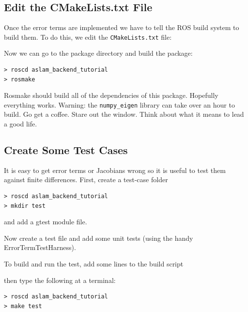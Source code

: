 \documentclass[11pt,a4,oneside]{article}
\newcommand{\txt}[1]{{\footnotesize\texttt{#1}}}
\newcommand{\listcpp}[2]{}
\newcommand{\listcpprange}[4]{}
\begin{document}
\subsection{Edit the CMakeLists.txt File}
Once the error terms are implemented we have to tell the ROS build system to build them. To do this, we edit the \txt{CMakeLists.txt} file:
\listcpprange{CMakeLists.txt}{../../aslam_backend_tutorial/CMakeLists.txt}{32}{38}
Now we can go to the package directory and build the package:
\begin{lstlisting}
> roscd aslam_backend_tutorial
> rosmake
\end{lstlisting}
Rosmake should build all of the dependencies of this package. Hopefully everything works. Warning: the \txt{numpy\_eigen} library can take over an hour to build. Go get a coffee. Stare out the window. Think about what it means to lead a good life.
\subsection{Create Some Test Cases}
It is easy to get error terms or Jacobians wrong so it is useful to test them against finite differences. First, create a test-case folder
\begin{lstlisting}
> roscd aslam_backend_tutorial
> mkdir test
\end{lstlisting}
and add a gtest module file.
\listcpp{test/test\_main.cpp}{../../aslam_backend_tutorial/test/test_main.cpp}
Now create a test file and add some unit tests (using the handy ErrorTermTestHarness).
\listcpp{test/ErrorTests.cpp}{../../aslam_backend_tutorial/test/ErrorTests.cpp}
To build and run the test, add some lines to the build script
\listcpprange{CMakeLists.txt}{../../aslam_backend_tutorial/CMakeLists.txt}{61}{67}
then type the following at a terminal:
\begin{lstlisting}
> roscd aslam_backend_tutorial
> make test
\end{lstlisting}
\end{document}
